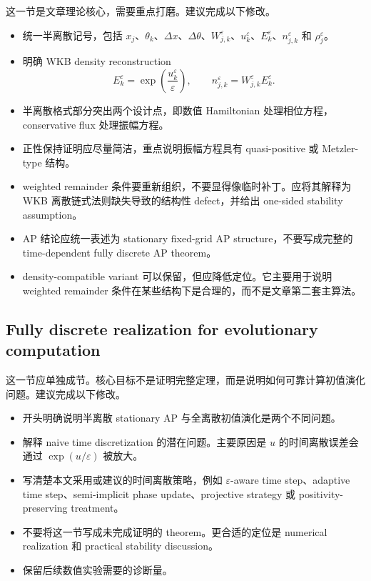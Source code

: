 \documentclass[11pt,a4paper]{ctexart}
\newcommand{\eps}{\varepsilon}
\begin{document}
这一节是文章理论核心，需要重点打磨。建议完成以下修改。
\begin{itemize}
    \item 统一半离散记号，包括 $x_j$、$\theta_k$、$\Delta x$、$\Delta\theta$、$W_{j,k}^\eps$、$u_k^\eps$、$E_k^\eps$、$n_{j,k}^\eps$ 和 $\rho_j^\eps$。
    \item 明确 WKB density reconstruction
    \begin{equation*}
        E_k^\eps=\exp\!\left(\frac{u_k^\eps}{\eps}\right),
        \qquad
        n_{j,k}^\eps = W_{j,k}^\eps E_k^\eps.
    \end{equation*}
    \item 半离散格式部分突出两个设计点，即数值 Hamiltonian 处理相位方程，conservative flux 处理振幅方程。
    \item 正性保持证明应尽量简洁，重点说明振幅方程具有 quasi-positive 或 Metzler-type 结构。
    \item weighted remainder 条件要重新组织，不要显得像临时补丁。应将其解释为 WKB 离散链式法则缺失导致的结构性 defect，并给出 one-sided stability assumption。
    \item AP 结论应统一表述为 stationary fixed-grid AP structure，不要写成完整的 time-dependent fully discrete AP theorem。
    \item density-compatible variant 可以保留，但应降低定位。它主要用于说明 weighted remainder 条件在某些结构下是合理的，而不是文章第二套主算法。
\end{itemize}

\subsection{Fully discrete realization for evolutionary computation}

这一节应单独成节。核心目标不是证明完整定理，而是说明如何可靠计算初值演化问题。建议完成以下修改。
\begin{itemize}
    \item 开头明确说明半离散 stationary AP 与全离散初值演化是两个不同问题。
    \item 解释 naive time discretization 的潜在问题。主要原因是 $u$ 的时间离散误差会通过 $\exp(u/\eps)$ 被放大。
    \item 写清楚本文采用或建议的时间离散策略，例如 $\eps$-aware time step、adaptive time step、semi-implicit phase update、projective strategy 或 positivity-preserving treatment。
    \item 不要将这一节写成未完成证明的 theorem。更合适的定位是 numerical realization 和 practical stability discussion。
    \item 保留后续数值实验需要的诊断量。
\end{itemize}
\end{document}
